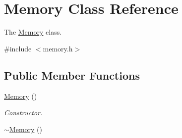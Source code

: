 \hypertarget{classMemory}{}\section{Memory Class Reference}
\label{classMemory}


The \hyperlink{classMemory}{Memory} class.  




{\ttfamily \#include $<$memory.\+h$>$}

\subsection*{Public Member Functions}
\begin{DoxyCompactItemize}
\item 
\hyperlink{classMemory_a585d7bb6fc6f2237bcebf94a86b7dd99}{Memory} ()\hypertarget{classMemory_a585d7bb6fc6f2237bcebf94a86b7dd99}{}\label{classMemory_a585d7bb6fc6f2237bcebf94a86b7dd99}

\begin{DoxyCompactList}\small\item\em Constructor. \end{DoxyCompactList}\item 
\hyperlink{classMemory_a0ffa9759ebbf103f11132a505b93bdc0}{$\sim$\+Memory} ()\hypertarget{classMemory_a0ffa9759ebbf103f11132a505b93bdc0}{}\label{classMemory_a0ffa9759ebbf103f11132a505b93bdc0}


\end{DoxyCompactItemize}
